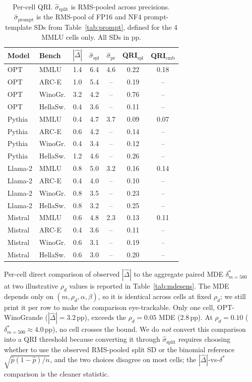 \documentclass{article}
\begin{document}
\begin{table}[t]
\caption{Per-cell QRI. $\hat\sigma_{\text{split}}$ is RMS-pooled across precisions. $\hat\sigma_{\text{prompt}}$ is the RMS-pool of FP16 and NF4 prompt-template SDs from Table~\ref{tab:prompt}, defined for the 4 MMLU cells only. All SDs in pp.}
\label{tab:qripercell}
\centering
\footnotesize
\setlength{\tabcolsep}{3pt}
\begin{tabular}{llccccc}
\toprule
Model & Bench & $|\hat\Delta|$ & $\hat\sigma_{\text{spl}}$ & $\hat\sigma_{\text{pr}}$ & QRI$_{\text{spl}}$ & QRI$_{\text{cmb}}$ \\
\midrule
OPT     & MMLU    & 1.4 & 6.4 & 4.6 & 0.22 & 0.18 \\
OPT     & ARC-E   & 1.0 & 5.4 & --  & 0.19 & --   \\
OPT     & WinoGr. & 3.2 & 4.2 & --  & 0.76 & --   \\
OPT     & HellaSw.& 0.4 & 3.6 & --  & 0.11 & --   \\
\midrule
Pythia  & MMLU    & 0.4 & 4.7 & 3.7 & 0.09 & 0.07 \\
Pythia  & ARC-E   & 0.6 & 4.2 & --  & 0.14 & --   \\
Pythia  & WinoGr. & 0.4 & 3.4 & --  & 0.12 & --   \\
Pythia  & HellaSw.& 1.2 & 4.6 & --  & 0.26 & --   \\
\midrule
Llama-2 & MMLU    & 0.8 & 5.0 & 3.2 & 0.16 & 0.14 \\
Llama-2 & ARC-E   & 0.4 & 4.0 & --  & 0.10 & --   \\
Llama-2 & WinoGr. & 0.8 & 3.5 & --  & 0.23 & --   \\
Llama-2 & HellaSw.& 0.8 & 3.2 & --  & 0.25 & --   \\
\midrule
Mistral & MMLU    & 0.6 & 4.8 & 2.3 & 0.13 & 0.11 \\
Mistral & ARC-E   & 0.4 & 3.6 & --  & 0.11 & --   \\
Mistral & WinoGr. & 0.6 & 3.1 & --  & 0.19 & --   \\
Mistral & HellaSw.& 0.6 & 3.0 & --  & 0.20 & --   \\
\bottomrule
\end{tabular}
\end{table}

Per-cell direct comparison of observed $|\hat\Delta|$ to the aggregate paired MDE $\delta^*_{m=500}$ at two illustrative $\rho_d$ values is reported in Table~\ref{tab:mdesens}. The MDE depends only on $(m, \rho_d, \alpha, \beta)$, so it is identical across cells at fixed $\rho_d$; we still print it per row to make the comparison eye-trackable. Only one cell, OPT-WinoGrande ($|\hat\Delta|{=}3.2$\,pp), exceeds the $\rho_d{=}0.05$ MDE ($2.8$\,pp). At $\rho_d{=}0.10$ ($\delta^*_{m=500}{\approx}4.0$\,pp), no cell crosses the bound. We do \emph{not} convert this comparison into a QRI threshold because converting it through $\hat\sigma_{\text{split}}$ requires choosing whether to use the observed RMS-pooled split SD or the binomial reference $\sqrt{\hat p(1-\hat p)/n}$, and the two choices disagree on most cells; the $|\hat\Delta|$-vs-$\delta^*$ comparison is the cleaner statistic.
\end{document}
